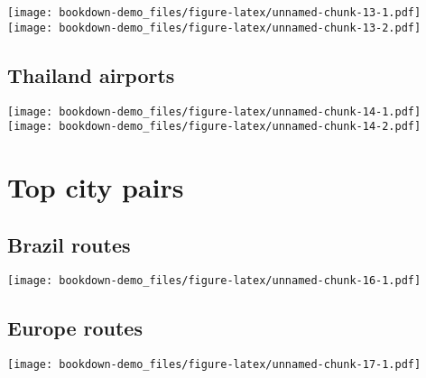 \documentclass[
]{book}
\begin{document}
\texttt{[image: bookdown-demo\_files/figure-latex/unnamed-chunk-13-1.pdf]} \texttt{[image: bookdown-demo\_files/figure-latex/unnamed-chunk-13-2.pdf]}

\hypertarget{thailand-airports-1}{%
\section{Thailand airports}\label{thailand-airports-1}}

\texttt{[image: bookdown-demo\_files/figure-latex/unnamed-chunk-14-1.pdf]} \texttt{[image: bookdown-demo\_files/figure-latex/unnamed-chunk-14-2.pdf]}

\hypertarget{top-city-pairs}{%
\chapter{Top city pairs}\label{top-city-pairs}}

\hypertarget{brazil-routes}{%
\section{Brazil routes}\label{brazil-routes}}

\texttt{[image: bookdown-demo\_files/figure-latex/unnamed-chunk-16-1.pdf]}

\hypertarget{europe-routes}{%
\section{Europe routes}\label{europe-routes}}

\texttt{[image: bookdown-demo\_files/figure-latex/unnamed-chunk-17-1.pdf]}

  
\end{document}
